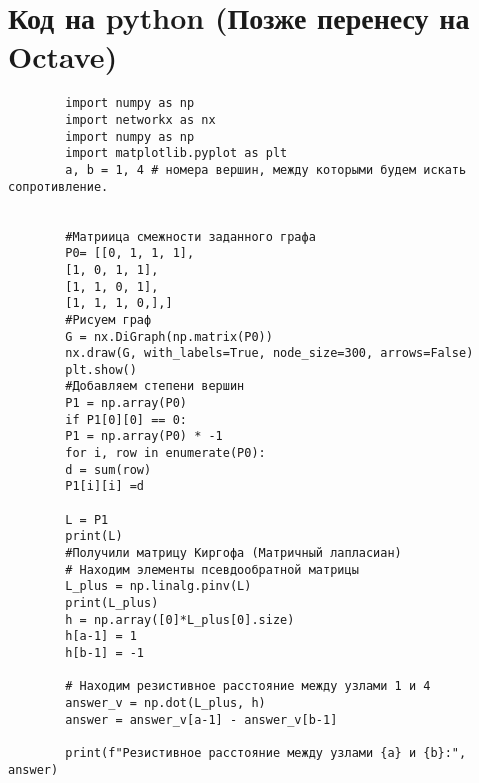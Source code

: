 \documentclass{article}
\begin{document}
	 
	 \section{Код на python (Позже перенесу на Octave)}
	 
	 
	 \begin{verbatim}
	 	import numpy as np
	 	import networkx as nx
	 	import numpy as np
	 	import matplotlib.pyplot as plt
	 	a, b = 1, 4 # номера вершин, между которыми будем искать сопротивление.
	 	
	 	
	 	#Матриица смежности заданного графа
	 	P0= [[0, 1, 1, 1],
	 	[1, 0, 1, 1],
	 	[1, 1, 0, 1],
	 	[1, 1, 1, 0,],]
	 	#Рисуем граф
	 	G = nx.DiGraph(np.matrix(P0))
	 	nx.draw(G, with_labels=True, node_size=300, arrows=False)
	 	plt.show()
	 	#Добавляем степени вершин
	 	P1 = np.array(P0)
	 	if P1[0][0] == 0:
	 	P1 = np.array(P0) * -1
	 	for i, row in enumerate(P0):
	 	d = sum(row)
	 	P1[i][i] =d
	 	
	 	L = P1
	 	print(L)
	 	#Получили матрицу Киргофа (Матричный лапласиан)
	 	# Находим элементы псевдообратной матрицы
	 	L_plus = np.linalg.pinv(L)
	 	print(L_plus)
	 	h = np.array([0]*L_plus[0].size)
	 	h[a-1] = 1
	 	h[b-1] = -1
	 	
	 	# Находим резистивное расстояние между узлами 1 и 4
	 	answer_v = np.dot(L_plus, h)
	 	answer = answer_v[a-1] - answer_v[b-1] 
	 	
	 	print(f"Резистивное расстояние между узлами {a} и {b}:", answer)
	 \end{verbatim}
	 
	 
	
\end{document}
